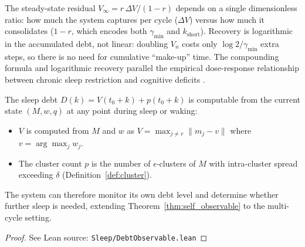 \begin{remark}
\label{rem:sleep_debt}
\leanok
{}
The steady-state residual $V_\infty = r\,\Delta V/(1-r)$ depends on a single dimensionless ratio: how much the system captures per cycle ($\Delta V$) versus how much it consolidates ($1-r$, which encodes both $\gamma_{\min}$ and $k_{\mathrm{short}}$).  Recovery is logarithmic in the accumulated debt, not linear: doubling $V_n$ costs only $\log 2/\gamma_{\min}$ extra steps, so there is no need for cumulative ``make-up'' time.  The compounding formula and logarithmic recovery parallel the empirical dose-response relationship between chronic sleep restriction and cognitive deficits \citep{vandongen2003}.
\end{remark}

\begin{corollary}
\label{cor:debt_observable}
\leanok
{}
The sleep debt $D(k) = V(t_0+k) + p(t_0+k)$ is computable from the current state $(M, w, q)$ at any point during sleep or waking:
\begin{itemize}
\item $V$ is computed from $M$ and $w$ as $V = \max_{j \neq v}\|m_j - v\|$ where $v = \arg\max_j w_j$.
\item The cluster count $p$ is the number of $\epsilon$-clusters of $M$ with intra-cluster spread exceeding $\delta$ (Definition~\ref{def:cluster}).
\end{itemize}
The system can therefore monitor its own debt level and determine whether further sleep is needed, extending Theorem~\ref{thm:self_observable} to the multi-cycle setting.
\end{corollary}

\begin{proof}
\leanok
{}
See Lean source: \texttt{Sleep/DebtObservable.lean}
\end{proof}

